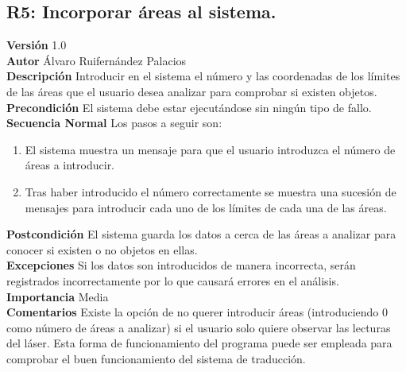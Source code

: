 \subsection{R5: Incorporar áreas al sistema.}
\textbf{Versión} 1.0\\
\textbf{Autor} Álvaro Ruifernández Palacios\\
\textbf{Descripción} Introducir en el sistema el número y las coordenadas de los límites de las áreas que el usuario desea analizar para comprobar si existen objetos.\\
\textbf{Precondición} El sistema debe estar ejecutándose sin ningún tipo de fallo.\\
\textbf{Secuencia Normal} Los pasos a seguir son:
\begin{enumerate}
	\item El sistema muestra un mensaje para que el usuario introduzca el número de áreas a introducir.
	\item Tras haber introducido el número correctamente se muestra una sucesión de mensajes para introducir cada uno de los límites de cada una de las áreas.
\end{enumerate}
\textbf{Postcondición} El sistema guarda los datos a cerca de las áreas a analizar para conocer si existen o no objetos en ellas.\\
\textbf{Excepciones} Si los datos son introducidos de manera incorrecta, serán registrados incorrectamente por lo que causará errores en el análisis.\\
\textbf{Importancia} Media\\
\textbf{Comentarios} Existe la opción de no querer introducir áreas (introduciendo 0 como número de áreas a analizar) si el usuario solo quiere observar las lecturas del láser. Esta forma de funcionamiento del programa puede ser empleada para comprobar el buen funcionamiento del sistema de traducción.\\

